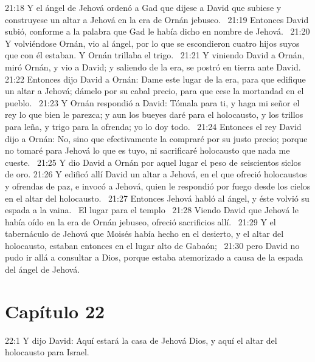 21:18 Y el ángel de Jehová ordenó a Gad que dijese a David que subiese y construyese un altar a Jehová en la era de Ornán jebuseo.  
21:19 Entonces David subió, conforme a la palabra que Gad le había dicho en nombre de Jehová.  
21:20 Y volviéndose Ornán, vio al ángel, por lo que se escondieron cuatro hijos suyos que con él estaban. Y Ornán trillaba el trigo.  
21:21 Y viniendo David a Ornán, miró Ornán, y vio a David; y saliendo de la era, se postró en tierra ante David.  
21:22 Entonces dijo David a Ornán: Dame este lugar de la era, para que edifique un altar a Jehová; dámelo por su cabal precio, para que cese la mortandad en el pueblo.  
21:23 Y Ornán respondió a David: Tómala para ti, y haga mi señor el rey lo que bien le parezca; y aun los bueyes daré para el holocausto, y los trillos para leña, y trigo para la ofrenda; yo lo doy todo.  
21:24 Entonces el rey David dijo a Ornán: No, sino que efectivamente la compraré por su justo precio; porque no tomaré para Jehová lo que es tuyo, ni sacrificaré holocausto que nada me cueste.  
21:25 Y dio David a Ornán por aquel lugar el peso de seiscientos siclos de oro. 
21:26 Y edificó allí David un altar a Jehová, en el que ofreció holocaustos y ofrendas de paz, e invocó a Jehová, quien le respondió por fuego desde los cielos en el altar del holocausto.  
21:27 Entonces Jehová habló al ángel, y éste volvió su espada a la vaina.  
El lugar para el templo  
21:28 Viendo David que Jehová le había oído en la era de Ornán jebuseo, ofreció sacrificios allí.  
21:29 Y el tabernáculo de Jehová que Moisés había hecho en el desierto, y el altar del holocausto, estaban entonces en el lugar alto de Gabaón;  
21:30 pero David no pudo ir allá a consultar a Dios, porque estaba atemorizado a causa de la espada del ángel de Jehová.  
\section*{Capítulo 22 }
22:1 Y dijo David: Aquí estará la casa de Jehová Dios, y aquí el altar del holocausto para Israel.  

